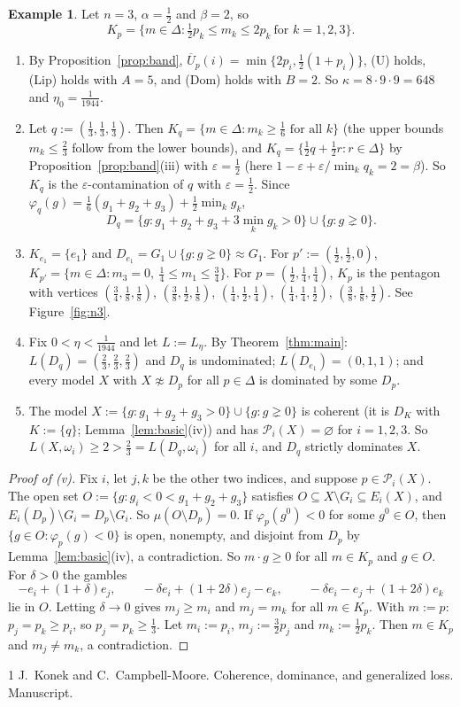 \documentclass[11pt]{article}
\theoremstyle{definition}
\newtheorem{example}[theorem]{Example}
\newcommand{\Pc}{\mathcal P}
\newcommand{\Ub}{\overline U}
\begin{document}
\begin{example}\label{ex:n3}
Let $n=3$, $\alpha=\frac12$ and $\beta=2$, so
\[
K_p=\big\{m\in\Delta:\tfrac12p_k\le m_k\le2p_k\ \text{for }k=1,2,3\big\}.
\]
\begin{enumerate}[label=(\roman*)]
\item By Proposition~\ref{prop:band}, $\Ub_p(i)=\min\{2p_i,\frac12(1+p_i)\}$, (U) holds, (Lip) holds with $A=5$, and (Dom) holds with $B=2$. So $\kappa=8\cdot9\cdot9=648$ and $\eta_0=\frac1{1944}$.
\item Let $q:=(\frac13,\frac13,\frac13)$. Then $K_q=\{m\in\Delta:m_k\ge\frac16\text{ for all }k\}$ (the upper bounds $m_k\le\frac23$ follow from the lower bounds), and $K_q=\{\frac12q+\frac12r:r\in\Delta\}$ by Proposition~\ref{prop:band}(iii) with $\varepsilon=\frac12$ (here $1-\varepsilon+\varepsilon/\min_kq_k=2=\beta$). So $K_q$ is the $\varepsilon$-contamination of $q$ with $\varepsilon=\frac12$. Since $\varphi_q(g)=\frac16(g_1+g_2+g_3)+\frac12\min_kg_k$,
\[
D_q=\{g:g_1+g_2+g_3+3\min_kg_k>0\}\cup\{g:g\gneq0\}.
\]
\item $K_{e_1}=\{e_1\}$ and $D_{e_1}=G_1\cup\{g:g\gneq0\}\approx G_1$. For $p':=(\frac12,\frac12,0)$, $K_{p'}=\{m\in\Delta:m_3=0,\ \frac14\le m_1\le\frac34\}$. For $p=(\frac12,\frac14,\frac14)$, $K_p$ is the pentagon with vertices $(\frac34,\frac18,\frac18)$, $(\frac38,\frac12,\frac18)$, $(\frac14,\frac12,\frac14)$, $(\frac14,\frac14,\frac12)$, $(\frac38,\frac18,\frac12)$. See Figure~\ref{fig:n3}.
\item Fix $0<\eta<\frac1{1944}$ and let $L:=L_\eta$. By Theorem~\ref{thm:main}: $L(D_q)=(\frac23,\frac23,\frac23)$ and $D_q$ is undominated; $L(D_{e_1})=(0,1,1)$; and every model $X$ with $X\not\approx D_p$ for all $p\in\Delta$ is dominated by some $D_p$.
\item The model $X:=\{g:g_1+g_2+g_3>0\}\cup\{g:g\gneq0\}$ is coherent (it is $D_K$ with $K:=\{q\}$; Lemma~\ref{lem:basic}(iv)) and has $\Pc_i(X)=\varnothing$ for $i=1,2,3$. So $L(X,\omega_i)\ge2>\frac23=L(D_q,\omega_i)$ for all $i$, and $D_q$ strictly dominates $X$.
\end{enumerate}
\end{example}

\begin{proof}[Proof of (v)]
Fix $i$, let $j,k$ be the other two indices, and suppose $p\in\Pc_i(X)$. The open set $O:=\{g:g_i<0<g_1+g_2+g_3\}$ satisfies $O\subseteq X\setminus G_i\subseteq E_i(X)$, and $E_i(D_p)\setminus G_i=D_p\setminus G_i$. So $\mu(O\setminus D_p)=0$. If $\varphi_p(g^0)<0$ for some $g^0\in O$, then $\{g\in O:\varphi_p(g)<0\}$ is open, nonempty, and disjoint from $D_p$ by Lemma~\ref{lem:basic}(iv), a contradiction. So $m\cdot g\ge0$ for all $m\in K_p$ and $g\in O$. For $\delta>0$ the gambles
\[
-e_i+(1+\delta)e_j,\qquad -\delta e_i+(1+2\delta)e_j-e_k,\qquad -\delta e_i-e_j+(1+2\delta)e_k
\]
lie in $O$. Letting $\delta\to0$ gives $m_j\ge m_i$ and $m_j=m_k$ for all $m\in K_p$. With $m:=p$: $p_j=p_k\ge p_i$, so $p_j=p_k\ge\frac13$. Let $m_i:=p_i$, $m_j:=\frac32p_j$ and $m_k:=\frac12p_k$. Then $m\in K_p$ and $m_j\neq m_k$, a contradiction.
\end{proof}

\begin{thebibliography}{1}
 J.~Konek and C.~Campbell-Moore. Coherence, dominance, and generalized loss. Manuscript.
\end{thebibliography}
\end{document}
